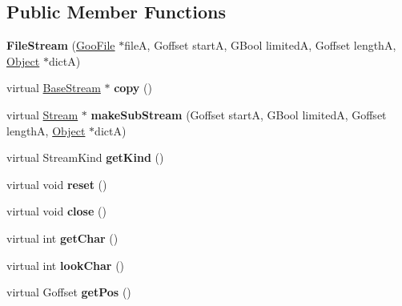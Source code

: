\subsection*{Public Member Functions}
\begin{DoxyCompactItemize}
\item 
\mbox{\label{class_file_stream_aca57f91a9c6c3d59f48eab6da15c4211}} 
{\bfseries File\+Stream} (\hyperlink{class_goo_file}{Goo\+File} $\ast$fileA, Goffset startA, G\+Bool limitedA, Goffset lengthA, \hyperlink{class_object}{Object} $\ast$dictA)
\item 
\mbox{\label{class_file_stream_ab8cbc3c12fba2ec2ba276590d027edec}} 
virtual \hyperlink{class_base_stream}{Base\+Stream} $\ast$ {\bfseries copy} ()
\item 
\mbox{\label{class_file_stream_a268a264b908d8944c092ffb9718726dc}} 
virtual \hyperlink{class_stream}{Stream} $\ast$ {\bfseries make\+Sub\+Stream} (Goffset startA, G\+Bool limitedA, Goffset lengthA, \hyperlink{class_object}{Object} $\ast$dictA)
\item 
\mbox{\label{class_file_stream_a3ee306480e8fe5d77add46d2d78c5646}} 
virtual Stream\+Kind {\bfseries get\+Kind} ()
\item 
\mbox{\label{class_file_stream_ab46973e54729961ed76240e05d58315d}} 
virtual void {\bfseries reset} ()
\item 
\mbox{\label{class_file_stream_aabe6773f78869890ef150f7cdb1689b4}} 
virtual void {\bfseries close} ()
\item 
\mbox{\label{class_file_stream_afa432e2fe6bccc209e5cf438589a6e5f}} 
virtual int {\bfseries get\+Char} ()
\item 
\mbox{\label{class_file_stream_a4d4eef3f83642fc433e399de14709b58}} 
virtual int {\bfseries look\+Char} ()
\item 
\mbox{\label{class_file_stream_aa1dcca854cd2adf0806f65732dfd3df5}} 
virtual Goffset {\bfseries get\+Pos} ()
\item 
\mbox{\label{class_file_stream_a5391ebf82d4dd843b6d3f6806146bef9}} 

\end{DoxyCompactItemize}
